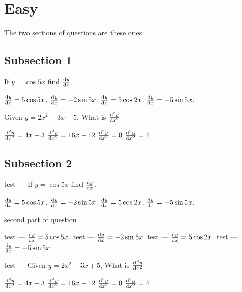 \documentclass{exam}
\begin{document}
\section{Easy}
The two sections of questions are these ones


\subsection{Subsection 1}\begin{questions}

	\question If $y=\cos5x$ find $\dv{y}{x}$.

	\begin{choices}
		\choice $\dv{y}{x} = 5\cos5x$.
		\choice $\dv{y}{x} = -2\sin5x$.
		\choice $\dv{y}{x} = 5\cos2x$.
		\CorrectChoice $\dv{y}{x} = -5\sin5x$.
	\end{choices}
	\question Given $y=2x^2-3x+5$, What is $\dv[2]{y}{x}$

	\begin{choices}
		\choice $\dv[2]{y}{x}=4x-3$
		\choice $\dv[2]{y}{x}=16x-12$
		\choice $\dv[2]{y}{x}=0$
		\CorrectChoice $\dv[2]{y}{x}=4$
	\end{choices}

\end{questions}

\subsection{Subsection 2}

\begin{questions}

	\question test --- If $y=\cos5x$ find $\dv{y}{x}$.

	\begin{choices}
		\choice $\dv{y}{x} = 5\cos5x$.
		\choice $\dv{y}{x} = -2\sin5x$.
		\choice $\dv{y}{x} = 5\cos2x$.
		\CorrectChoice $\dv{y}{x} = -5\sin5x$.
	\end{choices}
	second part of question
	\begin{choices}
		\choice test ---   $\dv{y}{x} = 5\cos5x$.
		\choice test ---   $\dv{y}{x} = -2\sin5x$.
		\choice test ---   $\dv{y}{x} = 5\cos2x$.
		\CorrectChoice test ---   $\dv{y}{x} = -5\sin5x$.
	\end{choices}
	\question test ---  Given $y=2x^2-3x+5$, What is $\dv[2]{y}{x}$

	\begin{choices}
		\choice $\dv[2]{y}{x}=4x-3$
		\choice $\dv[2]{y}{x}=16x-12$
		\choice $\dv[2]{y}{x}=0$
		\CorrectChoice $\dv[2]{y}{x}=4$
	\end{choices}

\end{questions}
\end{document}
